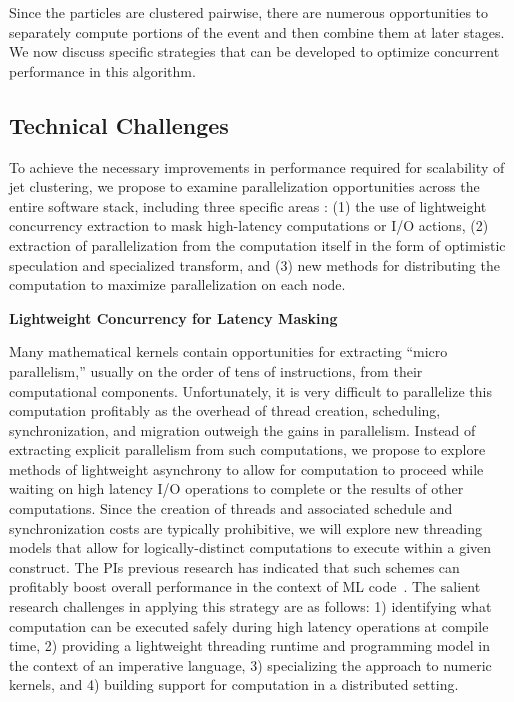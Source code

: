 \documentclass[times,11pt]{article}
\begin{document}
Since the particles are clustered pairwise, there are numerous
opportunities to separately compute portions of the event and then
combine them at later stages. 
We now
discuss specific strategies that can be developed 
to optimize concurrent performance in this algorithm. 


\iffalse
There is existing work and literature on the topic of the
parallelization of similar kNN algorithms, for instance, in
Refs.~\cite{knn_gpu_1, knn_gpu_2, knn_gpu_3}, where improvements
$O(100)$ in CPU performance are observed over standard
algorithms. Since the proposed use case is
very similar to the kNN algorithm, similar improvements to the
processing time by parallelization strategies are expected. 
\fi



\subsection{Technical Challenges}

To achieve the necessary improvements in performance required for scalability
of jet clustering, we propose to examine parallelization opportunities across
the entire software stack, including three specific areas : 
(1) the use of lightweight concurrency
extraction to mask high-latency computations or I/O actions, 
(2) extraction of
parallelization from the computation itself in the form of optimistic speculation
and specialized transform, and
(3) new methods for distributing the computation to
maximize parallelization on each node. 


\bigskip
\noindent
{\bf  Lightweight Concurrency for Latency Masking}
\bigskip

Many mathematical kernels contain opportunities for extracting ``micro parallelism,''
usually on the order of tens of instructions, from their computational components. 
Unfortunately, it is very difficult to parallelize this computation profitably as
the overhead of thread creation, scheduling, synchronization, and migration outweigh
the gains in parallelism. Instead of extracting explicit parallelism from such
computations, we propose to explore methods of lightweight asynchrony to allow for
computation to proceed while waiting on high latency I/O operations to complete or
the results of other computations. Since the creation of threads and associated
schedule and synchronization costs are typically prohibitive, we will explore new
threading models that allow for logically-distinct computations to execute within
a given construct. The PIs previous research has indicated that such schemes can profitably
boost overall performance in the context of ML code~\cite{acml, parasites}. 
The salient research
challenges in applying this strategy are as follows:  1) identifying what computation can be executed
safely during high latency operations at compile time, 2) providing a lightweight threading runtime
and programming model in the context of an imperative language, 
3) specializing the approach to numeric kernels,
and 4) building support for computation in a distributed setting.
\end{document}

